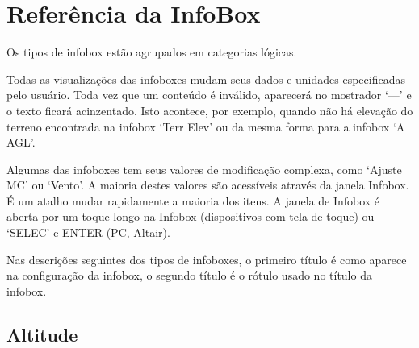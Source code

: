 \chapter{Referência da InfoBox}\label{cha:infobox}
Os tipos de infobox estão agrupados em categorias lógicas.

Todas as visualizações das infoboxes mudam seus dados e unidades especificadas pelo usuário.  Toda vez que um conteúdo é inválido, aparecerá no mostrador ‘—’ e o texto ficará acinzentado.  Isto acontece, por exemplo, quando não há elevação do terreno encontrada na infobox ‘Terr Elev’ ou da mesma forma para a infobox ‘A AGL’.

Algumas das infoboxes tem seus valores de modificação complexa, como ‘Ajuste MC’ ou ‘Vento’.  A maioria destes valores são acessíveis através da janela Infobox.  É um atalho mudar rapidamente a maioria dos itens.  A janela de Infobox é aberta por um toque longo na Infobox (dispositivos com tela de toque) ou ‘SELEC’ e ENTER (PC, Altair).

Nas descrições seguintes dos tipos de infoboxes, o primeiro título é como aparece na configuração da infobox, o segundo título é o rótulo usado no título da infobox.


\newcommand{\ibi}[3]{%
\jindent{
\begin{tabular}{r}
{\bf #1} \\
\infobox{{#2}} \\
\end{tabular}}{#3}
}
\newcommand{\ibig}[4]{%
\jindent{
\begin{tabular}{r}
{\bf #1} \\
\infobox{{#2}} \\
\texttt{[image: \#4]} \\
\end{tabular}}{#3}
}


\section{Altitude}

